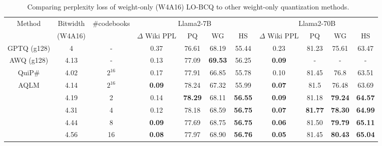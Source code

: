 \begin{table*} [!t]\scriptsize
\setlength{\tabcolsep}{4.75pt}
\caption{\small Comparing perplexity loss of weight-only (W4A16) LO-BCQ to other weight-only quantization methods. \label{tab:wonly_comparison}~}
\centering
\begin{tabular}{|c|c|c||c|c|c|c||c|c|c|c||} 
 \hline
 Method & Bitwidth & \#codebooks & \multicolumn{4}{c|}{\cellcolor[gray]{0.95} Llama2-7B } & \multicolumn{4}{c|}{\cellcolor[gray]{0.95} Llama2-70B} \\
  & (W4A16) & & $\Delta$ Wiki PPL & PQ & WG & HS & $\Delta$ Wiki PPL & PQ & WG & HS \\
 \hline
 GPTQ (g128) & 4 & - &  0.37 & 76.61 & 68.19 & 55.44 &  0.23 & 81.23 & 75.61 & 63.47 \\
 AWQ (g128) & 4.13 & - & 0.13 & 77.09 & \textbf{69.53} & 56.25 & \textbf{0.09} & - & - & - \\
 QuiP\# & 4.02 & $2^{16}$ & 0.17 & 77.91 & 66.85 & 55.78 & 0.10 & 81.45 & 76.8 & 63.51 \\
 AQLM & 4.14 & $2^{16}$ & \textbf{0.09} & 78.24 & 67.32 & 55.99 & \textbf{0.07} & 81.5 & 76.48 & 63.69 \\
 \rowcolor[gray]{0.9}
   & 4.19 & 2 & 0.14 & \textbf{78.29} & 68.11 & \textbf{56.55} & \textbf{0.09} & 81.18 & \textbf{79.24} & \textbf{64.57} \\
  \rowcolor[gray]{0.9}
   &  4.31 & 4 & 0.12 & 78.18 & 68.59 & \textbf{56.75} & \textbf{0.07} & \textbf{81.77} & \textbf{78.30} & \textbf{64.99} \\
   \rowcolor[gray]{0.9}
   &  4.44 &  8 &  \textbf{0.09} & 77.69 & 68.75 & \textbf{56.75} &  \textbf{0.06} & 81.50 & \textbf{79.79} & \textbf{65.11} \\
   \rowcolor[gray]{0.9}
  \multirow{-4}{*}{\textbf{LO-BCQ (g128)}} & 4.56 & 16 & \textbf{0.08} & 77.97 & 68.90 & \textbf{56.76} & \textbf{0.05} & 81.45 & \textbf{80.43} & \textbf{65.04} \\
 \hline
\end{tabular}
\end{table*}


